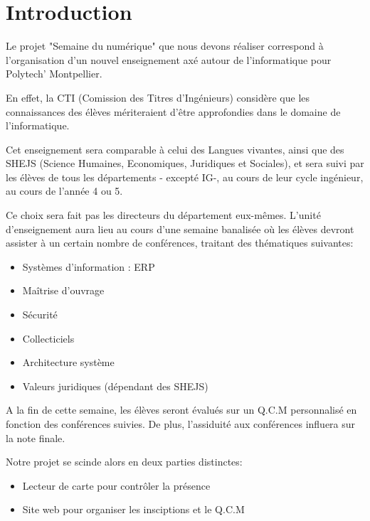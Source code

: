 \chapter{Introduction}

Le projet "Semaine du numérique" que nous devons réaliser correspond à l’organisation
d'un nouvel enseignement axé autour de l'informatique pour Polytech' Montpellier.

En effet, la CTI (Comission des Titres d'Ingénieurs) considère que les 
connaissances des élèves mériteraient d'être approfondies dans le domaine de l'informatique.

Cet enseignement sera comparable à celui des Langues vivantes, ainsi que des
SHEJS (Science Humaines, Economiques, Juridiques et Sociales), et sera suivi
par les élèves de tous les départements - excepté IG-, au cours de leur cycle 
ingénieur, au cours de l'année 4 ou 5.

Ce choix sera fait pas les directeurs du département eux-mêmes. L'unité 
d'enseignement aura lieu au cours d'une semaine banalisée où les élèves 
devront assister à un certain nombre de conférences, traitant des thématiques 
suivantes:

\begin{itemize}
\item Systèmes d’information : ERP
\item Maîtrise d’ouvrage
\item Sécurité
\item Collecticiels
\item Architecture système
\item Valeurs juridiques (dépendant des SHEJS)
\end{itemize}

A la fin de cette semaine, les élèves seront évalués sur un Q.C.M personnalisé 
en fonction des conférences suivies. De plus, l'assiduité aux conférences influera
sur la note finale.

Notre projet se scinde alors en deux parties distinctes:

\begin{itemize}
\item Lecteur de carte pour contrôler la présence
\item Site web pour organiser les insciptions et le  Q.C.M
\end{itemize}

